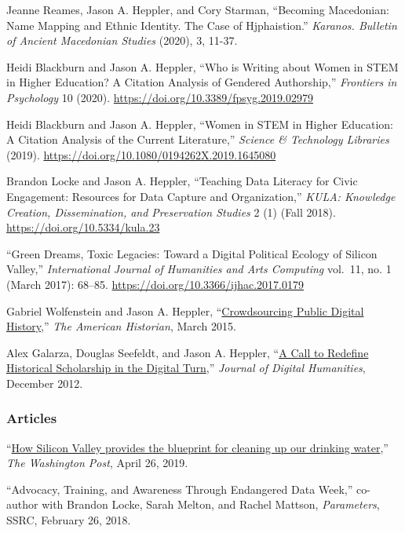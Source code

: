 Jeanne Reames, Jason A. Heppler, and Cory Starman, ``Becoming
Macedonian: Name Mapping and Ethnic Identity. The Case of Hjphaistion.''
\emph{Karanos. Bulletin of Ancient Macedonian Studies} (2020), 3, 11-37.

Heidi Blackburn and Jason A. Heppler, ``Who is Writing about Women in
STEM in Higher Education? A Citation Analysis of Gendered Authorship,''
\emph{Frontiers in Psychology} 10 (2020).
\url{https://doi.org/10.3389/fpsyg.2019.02979}

Heidi Blackburn and Jason A. Heppler, ``Women in STEM in Higher
Education: A Citation Analysis of the Current Literature,''
\emph{Science \& Technology Libraries} (2019).
\url{https://doi.org/10.1080/0194262X.2019.1645080}

Brandon Locke and Jason A. Heppler, ``Teaching Data Literacy for Civic
Engagement: Resources for Data Capture and Organization,'' \emph{KULA:
Knowledge Creation, Dissemination, and Preservation Studies} 2 (1) (Fall
2018). \url{https://doi.org/10.5334/kula.23}

``Green Dreams, Toxic Legacies: Toward a Digital Political Ecology of
Silicon Valley,'' \emph{International Journal of Humanities and Arts
Computing} vol.~11, no. 1 (March 2017): 68--85.
\url{https://doi.org/10.3366/ijhac.2017.0179}

Gabriel Wolfenstein and Jason A. Heppler,
``\href{http://tah.oah.org/content/crowdsourcing-digital-public-history/}{Crowdsourcing
Public Digital History},'' \emph{The American Historian}, March 2015.

Alex Galarza, Douglas Seefeldt, and Jason A. Heppler,
``\href{http://journalofdigitalhumanities.org/1-4/a-call-to-redefine-historical-scholarship-in-the-digital-turn/}{A
Call to Redefine Historical Scholarship in the Digital Turn},''
\emph{Journal of Digital Humanities}, December 2012.

\subsubsection{Articles}\label{articles}

``\href{https://www.washingtonpost.com/outlook/2019/04/26/how-silicon-valley-provides-blueprint-cleaning-up-our-drinking-water/}{How
Silicon Valley provides the blueprint for cleaning up our drinking
water},'' \emph{The Washington Post}, April 26, 2019.

``Advocacy, Training, and Awareness Through Endangered Data Week,''
co-author with Brandon Locke, Sarah Melton, and Rachel Mattson,
\emph{Parameters}, SSRC, February 26, 2018.

